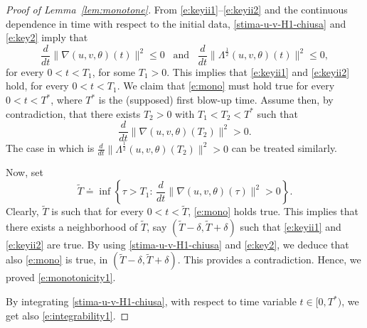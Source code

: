 \documentclass[10pt,a4paper]{amsart}
\begin{document}
\begin{proof}[Proof of Lemma~\ref{lem:monotone}]
  From \eqref{e:keyii1}--\eqref{e:keyii2} and the continuous
  dependence in time with respect to the initial data,
  \eqref{stima-u-v-H1-chiusa} and \eqref{e:key2} imply that
  \begin{equation}
    \label{e:mono} \frac{d}{dt}\| \nabla (u,v,\theta)
    (t)\|^2\leq 0\,\,\, \textrm{ and }\,\,\, \frac{d}{dt} \|
    \Lambda^{\frac12} (u,v,\theta)(t)\|^2 \le 0,
  \end{equation}
  for every $0<t<T_1$, for some $T_1>0$. This implies that
  \eqref{e:keyii1} and \eqref{e:keyii2} hold, for every $0<t<T_1$. We
  claim that \eqref{e:mono} must hold true for every $0<t<T^*$, where
  $T^\ast$ is the (supposed) first blow-up time. Assume then, by
  contradiction, that there exists $T_2>0$ with $T_1 < T_2 <T^*$ such
  that
  \begin{equation*}
    \frac{d}{dt}\|\nabla (u,v,\theta)(T_2)\|^2 >0.
  \end{equation*}
  The case in which is $\frac{d}{dt}\|\Lambda^{\frac{1}{2}} (u,v,\theta)(T_2)\|^2 >0$ can be
  treated similarly.

  Now, set
  \begin{equation*}
    \tilde{T}\doteq \inf\left\{\tau >T_1: \, \frac{d}{dt}\|\nabla (u,v,\theta)(\tau)\|^2 >0\right\}.
  \end{equation*}
  Clearly, $\tilde{T}$ is such that for every $0<t<\tilde{T}$,
  \eqref{e:mono} holds true. This implies that there exists a
  neighborhood of $\tilde{T}$, say
  $(\tilde{T}-\delta, \tilde{T}+\delta)$ such that \eqref{e:keyii1}
  and \eqref{e:keyii2} are true. By using \eqref{stima-u-v-H1-chiusa}
  and \eqref{e:key2}, we deduce that also \eqref{e:mono} is true, in
  $(\tilde{T}-\delta, \tilde{T}+\delta)$. This provides a
  contradiction. Hence, we proved \eqref{e:monotonicity1}.
  
  By integrating \eqref{stima-u-v-H1-chiusa}, with respect to time
  variable $t\in [0, T^\ast)$, we get also \eqref{e:integrability1}.
%
\end{proof}
\end{document}
